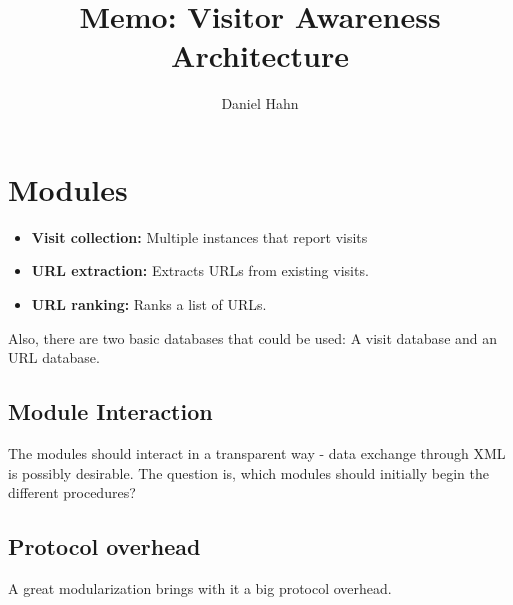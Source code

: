 \documentclass[a4paper]{danarticle}
\begin{document}
  \author{Daniel Hahn}
  \title{Memo: Visitor Awareness Architecture}
  \maketitle

  \section*{Modules}
    \begin{itemize}
      \item{\textbf{Visit collection:} Multiple instances that report 
            visits}
      \item{\textbf{URL extraction:} Extracts URLs from existing visits.}
      \item{\textbf{URL ranking:} Ranks a list of URLs.}
    \end{itemize}  
    Also, there are two basic databases that could be used: A visit database and
    an URL database.
    \subsection*{Module Interaction}
      The modules should interact in a transparent way - data exchange through
      XML is possibly desirable. The question is, which modules should initially
      begin the different procedures?
    \subsection*{Protocol overhead}
      A great modularization brings with it a big protocol overhead. 
\end{document}
